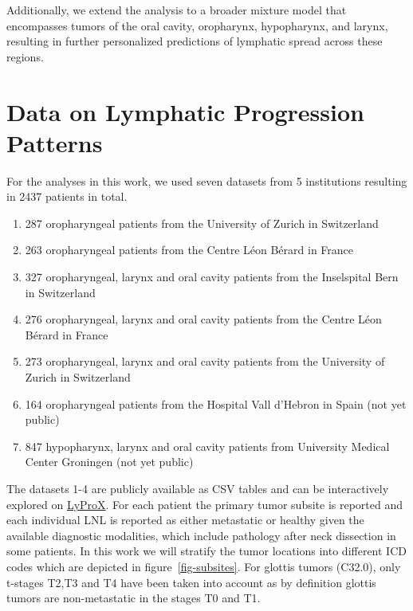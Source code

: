 \documentclass[
  sn-mathphys-num,
]{sn-jnl}
\providecommand{\tightlist}{%
  \setlength{\itemsep}{0pt}\setlength{\parskip}{0pt}}\usepackage{longtable,booktabs,array}
\begin{document}
Additionally, we extend the analysis to a broader mixture model that
encompasses tumors of the oral cavity, oropharynx, hypopharynx, and
larynx, resulting in further personalized predictions of lymphatic
spread across these regions.

\section{Data on Lymphatic Progression Patterns}\label{sec-data}

For the analyses in this work, we used seven datasets from 5
institutions resulting in 2437 patients in total.

\begin{enumerate}
\def\labelenumi{\arabic{enumi}.}
\tightlist
\item
  287 oropharyngeal patients from the University of Zurich in
  Switzerland
\item
  263 oropharyngeal patients from the Centre Léon Bérard in France
\item
  327 oropharyngeal, larynx and oral cavity patients from the
  Inselspital Bern in Switzerland
\item
  276 oropharyngeal, larynx and oral cavity patients from the Centre
  Léon Bérard in France
\item
  273 oropharyngeal, larynx and oral cavity patients from the University
  of Zurich in Switzerland
\item
  164 oropharyngeal patients from the Hospital Vall d'Hebron in Spain
  (not yet public)
\item
  847 hypopharynx, larynx and oral cavity patients from University
  Medical Center Groningen (not yet public)
\end{enumerate}

The datasets 1-4 are publicly available as CSV tables
\citep{ludwig_multi-centric_2023, ludwig_detailed_2022} and can be
interactively explored on \href{https://lyprox.org}{LyProX}. For each
patient the primary tumor subsite is reported and each individual LNL is
reported as either metastatic or healthy given the available diagnostic
modalities, which include pathology after neck dissection in some
patients. In this work we will stratify the tumor locations into
different ICD codes which are depicted in figure~\ref{fig-subsites}. For
glottis tumors (C32.0), only t-stages T2,T3 and T4 have been taken into
account as by definition glottis tumors are non-metastatic in the stages
T0 and T1.
\end{document}
